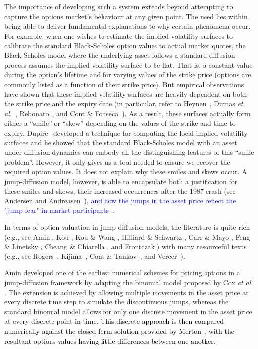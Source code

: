 The importance of developing such a system extends beyond attempting to capture the options market's behaviour at any given point. The need lies within being able to deliver fundamental explanations to why certain phenomena occur. For example, when one wishes to estimate the implied volatility surfaces to calibrate the standard Black-Scholes option values to actual market quotes, the Black-Scholes model where the underlying asset follows a standard diffusion process assumes the implied volatility surface to be flat. That is, a constant value during the option's lifetime and for varying values of the strike price (options are commonly listed as a function of their strike price). But empirical observations have shown that these implied volatility surfaces are heavily dependent on both the strike price and the expiry date (in particular, refer to Heynen~\cite{Heynen1994}, Dumas \emph{et al.}~\cite{Dumas1998}, Rebonato~\cite{Rebonato1999}, and Cont \& Fonseca~\cite{Cont2001, Cont2002}). As a result, these surfaces actually form either a ``smile'' or ``skew'' depending on the values of the strike and time to expiry. Dupire~\cite{Dupire1994} developed a technique for computing the local implied volatility surfaces and he showed that the standard Black-Scholes model with an asset under diffusion dynamics can embody all the distinguishing features of this ``smile problem''. However, it only gives us a tool needed to ensure we recover the required option values. It does not explain why these smiles and skews occur. A jump-diffusion model, however, is able to encapsulate both a justification for these smiles and skews, their increased occurrences after the 1987 crash (see Andersen and Andreasen~\cite{Andersen2000}), \textcolor{blue}{and how the jumps in the asset price reflect the "jump fear" in market participants~\cite{Cont2004}}.

In terms of option valuation in jump-diffusion models, the literature is quite rich (e.g., see Amin \cite{Armin1993}, Kou \cite{Kou2002}, Kou \& Wang \cite{Kou2004}, Hilliard \& Schwartz \cite{Hilliard2005}, Carr \& Mayo \cite{Carr2007}, Feng \& Linetsky \cite{Feng2008}, Cheang \& Chiarella \cite{Cheang2011}, and Frontczak \cite{Frontczak2013}) with many resourceful texts (e.g., see Rogers~\cite{Rogers1997}, Kijima~\cite{Kijima2002}, Cont \& Tankov~\cite{Cont2004}, and Vercer~\cite{Vecer2011}).

Amin \cite{Armin1993} developed one of the earliest numerical schemes for pricing options in a jump-diffusion framework by adapting the binomial model proposed by Cox \emph{et al}. \cite{Cox1979}. The extension is achieved by allowing multiple movements in the asset price at every discrete time step to simulate the discontinuous jumps, whereas the standard binomial model allows for only one discrete movement in the asset price at every discrete point in time. \textcolor{black}{This discrete approach is then compared numerically against the closed-form solution provided by Merton~\cite{Merton1976}, with the resultant options values having little differences between one another.}

